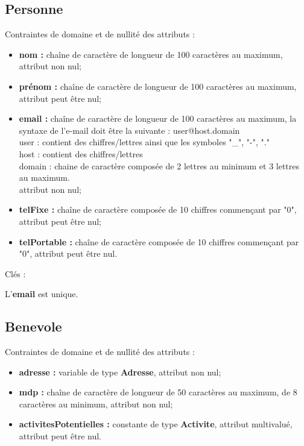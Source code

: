 \documentclass[asi, sansVersion]{picInsa}
\begin{document}
\subsection*{Personne}
Contraintes de domaine et de nullité des attributs :
\begin{itemize}
 	\item \textbf{nom :} chaîne de caractère de longueur de 100 caractères au maximum, attribut non nul;
	\item \textbf{prénom :} chaîne de caractère de longueur de 100 caractères au maximum, attribut peut être nul;
	\item \textbf{email :} chaîne de caractère de longueur de 100 caractères au maximum, la syntaxe de l'e-mail doit être la suivante : user@host.domain\\
	user : contient des chiffres/lettres ainsi que les symboles "\_", "-", "." \\
	host : contient des chiffres/lettres \\
	domain : chaine de caractère composée de 2 lettres au minimum et 3 lettres au maximum. \\
	attribut non nul;  
	\item \textbf{telFixe :} chaîne de caractère composée de 10 chiffres commençant par "0", attribut peut être nul;
	\item \textbf{telPortable :} chaîne de caractère composée de 10 chiffres commençant par "0", attribut peut être nul.\\
\end{itemize}  

Clés : 

L'\textbf{email} est unique.\\

\subsection*{Benevole}
Contraintes de domaine et de nullité des attributs :
\begin{itemize}
 	\item \textbf{adresse :} variable de type \textbf{Adresse}, attribut non nul;
	\item \textbf{mdp :} chaîne de caractère de longueur de 50 caractères au maximum, de 8 caractères au minimum, attribut non nul;  
	\item \textbf{activitesPotentielles :} constante de type \textbf{Activite}, attribut multivalué, attribut  peut être nul.\\
\end{itemize}  
\end{document}
